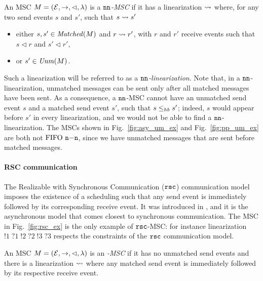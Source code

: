\begin{definition}\label{def:n_n}
	An MSC $M = (\mathcal{E},\to,\lhd,\lambda)$ is a \emph{$\mathtt{nn}$-MSC} if it has a linearization $\rightsquigarrow$ where, for any two send events $s$ and $s'$, such that $s \rightsquigarrow s'$
	\begin{itemize}%
		\item either $s,s' \in \mathit{Matched}(M)$ and $r \rightsquigarrow r'$, with $r$ and $r'$   receive events such that $s \lhd r$ and $s' \lhd r'$,
		\item or $s' \in \mathit{Unm}(M)$.
	\end{itemize}
\end{definition}

Such a linearization will be referred to as a \emph{$\mathtt{nn}$-linearization}. Note that, in a $\mathtt{nn}$-linearization, unmatched messages can be sent only after all matched messages have been sent.
As a consequence, a $\mathtt{nn}$-MSC cannot have an unmatched send event $s$ and a matched send event $s'$, such that $s \leq_{hb} s'$; indeed, $s$ would appear before $s'$ in every linearization, and we would not be able to find a $\mathtt{nn}$-linearization. The MSCs shown in Fig.~\ref{fig:asy_um_ex} and Fig.~\ref{fig:pp_um_ex} are both not $\text{FIFO } \mathtt{n\mathsf{-}n}$, since we have unmatched messages that are sent before matched messages.


\paragraph{\bf RSC communication}
The Realizable with Synchronous Communication ($\mathtt{rsc}$) communication model imposes the existence of a scheduling such that any send event is  immediately followed by its corresponding receive event. It was introduced in \cite{DBLP:journals/dc/Charron-BostMT96}, and it is the asynchronous model that comes closest to synchronous communication. %
The MSC  in Fig.~\ref{fig:rsc_ex} is the only example of $\mathtt{rsc}$-MSC: for instance linearization $!1\;?1\;!2\;?2\;!3\;?3$ respects the constraints of the $\mathtt{rsc}$ communication model. 

\begin{definition}\label{def:rsc}
	An MSC $M = (\mathcal{E},\to,\lhd,\lambda)$ is an \emph{\rsc-MSC} if it has no unmatched send events and there is a linearization $\rightsquigarrow$ where any matched send event is immediately followed by its respective receive event.
\end{definition}

